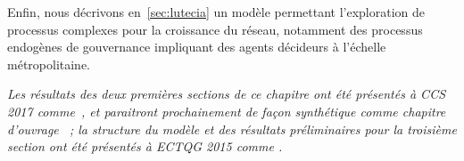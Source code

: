 Enfin, nous décrivons en~\ref{sec:lutecia} un modèle permettant l'exploration de processus complexes pour la croissance du réseau, notamment des processus endogènes de gouvernance impliquant des agents décideurs à l'échelle métropolitaine.


\vspace{-0.5cm}

\stars

\vspace{-0.5cm}

\textit{Les résultats des deux premières sections de ce chapitre ont été présentés à CCS 2017 comme~\cite{raimbault:halshs-01590624}, et paraitront prochainement de façon synthétique comme chapitre d'ouvrage~\cite{raimbault2018urban} ; la structure du modèle et des résultats préliminaires pour la troisième section ont été présentés à ECTQG 2015 comme \cite{le2015modeling}.}






